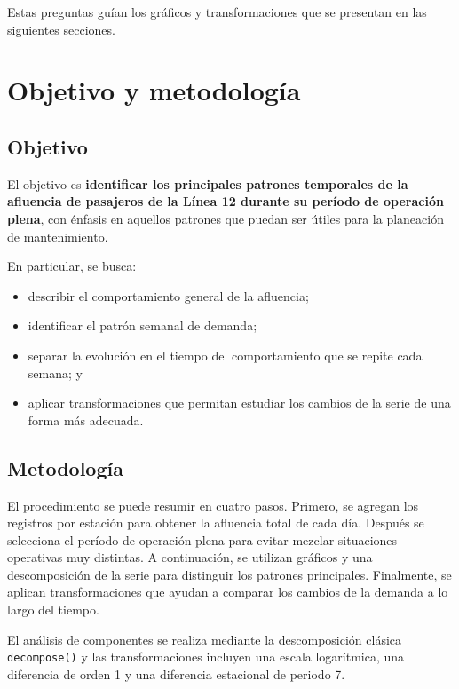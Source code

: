 \documentclass[
  12pt,
  titlepage]{article}
\providecommand{\tightlist}{%
  \setlength{\itemsep}{0pt}\setlength{\parskip}{0pt}}
\begin{document}
Estas preguntas guían los gráficos y transformaciones que se presentan en las siguientes secciones.

\section{Objetivo y metodología}\label{objetivo-y-metodologuxeda}

\subsection{Objetivo}\label{objetivo}

El objetivo es \textbf{identificar los principales patrones temporales de la afluencia de pasajeros de la Línea 12 durante su período de operación plena}, con énfasis en aquellos patrones que puedan ser útiles para la planeación de mantenimiento.

En particular, se busca:

\begin{itemize}
\tightlist
\item
  describir el comportamiento general de la afluencia;
\item
  identificar el patrón semanal de demanda;
\item
  separar la evolución en el tiempo del comportamiento que se repite cada semana; y
\item
  aplicar transformaciones que permitan estudiar los cambios de la serie de una forma más adecuada.
\end{itemize}

\subsection{Metodología}\label{metodologuxeda}

El procedimiento se puede resumir en cuatro pasos. Primero, se agregan los registros por estación para obtener la afluencia total de cada día. Después se selecciona el período de operación plena para evitar mezclar situaciones operativas muy distintas. A continuación, se utilizan gráficos y una descomposición de la serie para distinguir los patrones principales. Finalmente, se aplican transformaciones que ayudan a comparar los cambios de la demanda a lo largo del tiempo.

\begin{notatecnica}
El análisis de componentes se realiza mediante la descomposición clásica
\texttt{decompose()} y las transformaciones incluyen una escala logarítmica,
una diferencia de orden 1 y una diferencia estacional de periodo 7.
\end{notatecnica}
\end{document}
